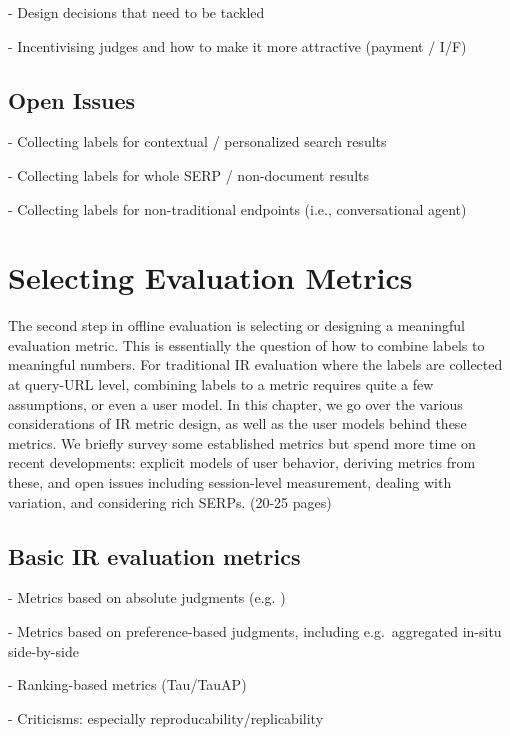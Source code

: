 \documentclass[openany]{now} %
\begin{document}
- Design decisions that need to be tackled  \cite{Blanco:2011} \cite{Kazai2012} \cite{Alonso2012} \cite{Alonso:2015} \cite{Scholer:2013} 

- Incentivising judges and how to make it more attractive (payment / I/F)
\cite{Megorskaya2015} \cite{Davtyan2015}  \cite{Rokicki:2014}  \cite{Eickhoff:2012}

\section{Open Issues}

- Collecting labels for contextual / personalized search results

- Collecting labels for whole SERP / non-document results

- Collecting labels for non-traditional endpoints (i.e., conversational agent)

\chapter{Selecting Evaluation Metrics}
\label{c-metrics}

The second step in offline evaluation is selecting or designing a meaningful evaluation metric. This is essentially the question of how to combine labels to meaningful numbers. For traditional IR evaluation where the labels are collected at query-URL level, combining labels to a metric requires quite a few assumptions, or even a user model. In this chapter, we go over the various considerations of IR metric design, as well as the user models behind these metrics. We briefly survey some established metrics but spend more time on recent developments: explicit models of user behavior, deriving metrics from these, and open issues including session-level measurement, dealing with variation, and considering rich SERPs. (20-25 pages)

\section{Basic IR evaluation metrics}

- Metrics based on absolute judgments (e.g. \cite{cooper73selecting})

- Metrics based on preference-based judgments, including e.g.\ aggregated in-situ side-by-side \cite{Thomas2006}

- Ranking-based metrics (Tau/TauAP)

- Criticisms: especially reproducability/replicability
\end{document}
